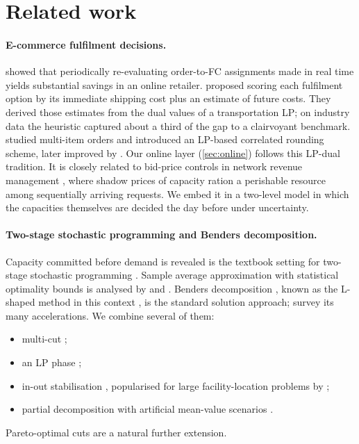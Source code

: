 \section{Related work}\label{sec:related}

\paragraph{E-commerce fulfilment decisions.}
\citet{xu2009} showed that periodically re-evaluating order-to-FC assignments made in real time yields substantial savings in an online retailer.
\citet{acimovic2015} proposed scoring each fulfilment option by its immediate shipping cost plus an estimate of future costs.
They derived those estimates from the dual values of a transportation LP; on industry data the heuristic captured about a third of the gap to a clairvoyant benchmark.
\citet{jasin2015} studied multi-item orders and introduced an LP-based correlated rounding scheme, later improved by \citet{ma2023}.
Our online layer (\cref{sec:online}) follows this LP-dual tradition.
It is closely related to bid-price controls in network revenue management \citep{talluri1998}, where shadow prices of capacity ration a perishable resource among sequentially arriving requests.
We embed it in a two-level model in which the capacities themselves are decided the day before under uncertainty.

\paragraph{Two-stage stochastic programming and Benders decomposition.}
Capacity committed before demand is revealed is the textbook setting for two-stage stochastic programming \citep{birge2011,shapiro2009}.
Sample average approximation with statistical optimality bounds is analysed by \citet{kleywegt2002} and \citet{mak1999}.
Benders decomposition \citep{benders1962}, known as the L-shaped method in this context \citep{vanslyke1969}, is the standard solution approach; \citet{rahmaniani2017} survey its many accelerations.
We combine several of them:
\begin{itemize}
  \item multi-cut \citep{birge1988};
  \item an LP phase \citep{mcdaniel1977};
  \item in-out stabilisation \citep{benameur2007}, popularised for large facility-location problems by \citet{fischetti2017};
  \item partial decomposition with artificial mean-value scenarios \citep{crainic2021}.
\end{itemize}
Pareto-optimal cuts \citep{magnanti1981} are a natural further extension.

